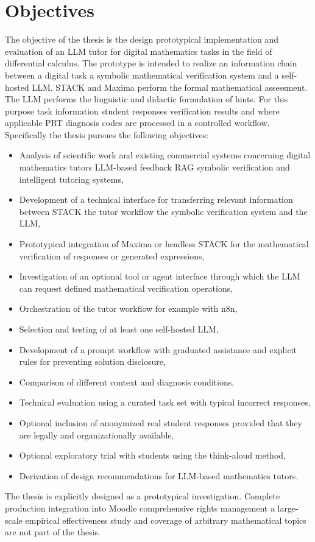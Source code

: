 \documentclass[11pt,a4paper,oneside,ngerman]{memoir}
\begin{document}
\chapter{Objectives}
The objective of the thesis is the design prototypical implementation and evaluation of an LLM tutor for digital mathematics tasks in the field of differential calculus.
The prototype is intended to realize an information chain between a digital task a symbolic mathematical verification system and a self-hosted LLM. STACK and Maxima perform the formal mathematical assessment. The LLM performs the linguistic and didactic formulation of hints. For this purpose task information student responses verification results and where applicable PRT diagnosis codes are processed in a controlled workflow.
\hspace{1 cm}\\
Specifically the thesis pursues the following objectives:
\begin{itemize}
    \item Analysis of scientific work and existing commercial systems concerning digital mathematics tutors LLM-based feedback RAG symbolic verification and intelligent tutoring systems,
    \item Development of a technical interface for transferring relevant information between STACK the tutor workflow the symbolic verification system and the LLM,
    \item Prototypical integration of Maxima or headless STACK for the mathematical verification of responses or generated expressions,
    \item Investigation of an optional tool or agent interface through which the LLM can request defined mathematical verification operations,
    \item Orchestration of the tutor workflow for example with n8n,
    \item Selection and testing of at least one self-hosted LLM,
    \item Development of a prompt workflow with graduated assistance and explicit rules for preventing solution disclosure,
    \item Comparison of different context and diagnosis conditions,
    \item Technical evaluation using a curated task set with typical incorrect responses,
    \item Optional inclusion of anonymized real student responses provided that they are legally and organizationally available,
    \item Optional exploratory trial with students using the think-aloud method,
    \item Derivation of design recommendations for LLM-based mathematics tutors.
\end{itemize}
The thesis is explicitly designed as a prototypical investigation. Complete production integration into Moodle comprehensive rights management a large-scale empirical effectiveness study and coverage of arbitrary mathematical topics are not part of the thesis.
\end{document}
